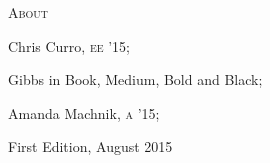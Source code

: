 \documentclass{article}
\begin{document}
\begin{minipage}[t]{0.46\linewidth}
\fontsize{9.5pt}{9.5pt}\selectfont
\upshape
\raggedright
\nocite{*}



\vspace{0.1in}

\scshape \fontsize{16pt}{16pt}\selectfont {} About
\fontsize{10pt}{10pt}\selectfont
\upshape
\raggedright

\begin{description}
\itemsep1pt
\item[Contributors:] Chris Curro, {\scshape ee '15}; 
\item[Typefaces:] Gibbs in Book, Medium, Bold and Black;
\item[Special Thanks:] Amanda Machnik, {\scshape a '15};
\item[Printing:] First Edition, August 2015
\end{description}
\end{minipage}
\end{document}
